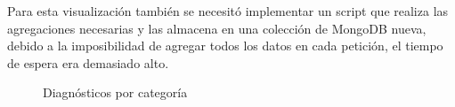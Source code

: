 Para esta visualización también se necesitó implementar un script que realiza las agregaciones necesarias y las almacena en una colección de MongoDB nueva, debido a la imposibilidad de agregar todos los datos en cada petición, el tiempo de espera era demasiado alto.
\begin{figure}[H]
  \centering
  \caption{Diagnósticos por categoría}
  \label{fig:chart-diag}
\end{figure}

